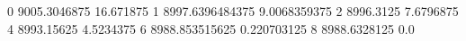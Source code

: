 0 9005.3046875 16.671875
1 8997.6396484375 9.0068359375
2 8996.3125 7.6796875
4 8993.15625 4.5234375
6 8988.853515625 0.220703125
8 8988.6328125 0.0

